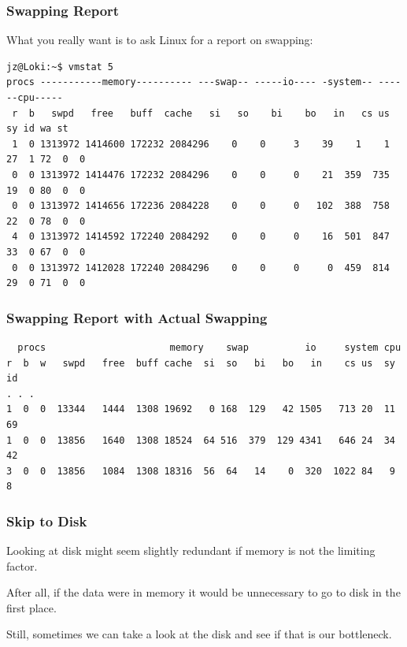 \begin{frame}[fragile]
\frametitle{Swapping Report}



What you really want is to ask Linux for a report on swapping:

\vspace*{-2em}
{\scriptsize
\begin{verbatim}
jz@Loki:~$ vmstat 5
procs -----------memory---------- ---swap-- -----io---- -system-- ------cpu-----
 r  b   swpd   free   buff  cache   si   so    bi    bo   in   cs us sy id wa st
 1  0 1313972 1414600 172232 2084296    0    0     3    39    1    1 27  1 72  0  0
 0  0 1313972 1414476 172232 2084296    0    0     0    21  359  735 19  0 80  0  0
 0  0 1313972 1414656 172236 2084228    0    0     0   102  388  758 22  0 78  0  0
 4  0 1313972 1414592 172240 2084292    0    0     0    16  501  847 33  0 67  0  0
 0  0 1313972 1412028 172240 2084296    0    0     0     0  459  814 29  0 71  0  0
\end{verbatim}
}

\end{frame}



\begin{frame}[fragile]
\frametitle{Swapping Report with Actual Swapping}

{\small
\begin{verbatim}
  procs                      memory    swap          io     system cpu
r  b  w   swpd   free  buff cache  si  so   bi   bo   in    cs us  sy  id
. . .
1  0  0  13344   1444  1308 19692   0 168  129   42 1505   713 20  11  69
1  0  0  13856   1640  1308 18524  64 516  379  129 4341   646 24  34  42
3  0  0  13856   1084  1308 18316  56  64   14    0  320  1022 84   9   8
\end{verbatim}
}

\end{frame}



\begin{frame}
\frametitle{Skip to Disk}



Looking at disk might seem slightly redundant if memory is not the limiting factor. 

After all, if the data were in memory it would be unnecessary to go to disk in the first place. 

Still, sometimes we can take a look at the disk and see if that is our bottleneck.


\end{frame}




